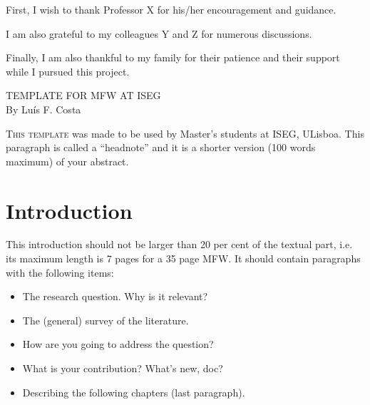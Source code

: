 \documentclass [12pt,a4paper,oneside]{article}
\begin{document}
First, I wish to thank Professor X for his/her encouragement and guidance.

I am also grateful to my colleagues Y and Z for numerous discussions.

Finally, I am also thankful to my family for their patience and their support while I pursued this project.

	\newpage %
	\thispagestyle{plain}%
	
\begin{center} %

\textsc{TEMPLATE FOR MFW AT ISEG}\\ %
    
By Luís F. Costa\\
    

\begin{changemargin}{2cm}{2cm} %
{\footnotesize \textsc{This template} was made to be used by Master’s students at ISEG, ULisboa. This paragraph is called a “headnote” and it is a shorter version (100 words maximum) of your abstract.}
\end{changemargin}

\end{center} %


\section{Introduction}\label{sec:introduction}

This introduction should not be larger than 20 per cent of the textual part, i.e. its maximum length is 7 pages for a 35 page MFW. It should contain paragraphs with the following items:
\begin{itemize}
\item The research question. Why is it relevant?
\item The (general) survey of the literature.
\item How are you going to address the question?
\item What is your contribution? What’s new, doc?
\item Describing the following chapters (last paragraph).
\end{itemize}
\end{document}
